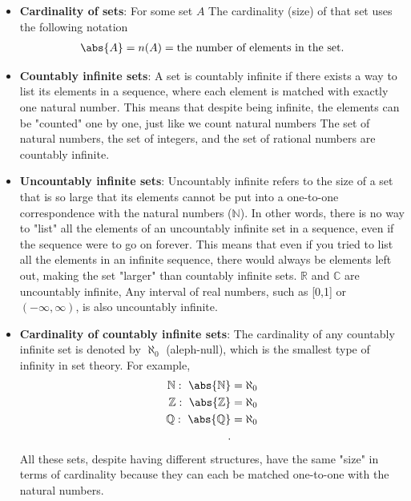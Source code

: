 \documentclass{report}
\begin{document}
\begin{itemize}
        \item \textbf{Cardinality of sets}: For some set $A$ The cardinality (size) of that set uses the following notation
            \begin{align*}
                \abs{A} = n(A) = \text{the number of elements in the set}
            .\end{align*}
        \item \textbf{Countably infinite sets}: A set is countably infinite if there exists a way to list its elements in a sequence, where each element is matched with exactly one natural number. This means that despite being infinite, the elements can be "counted" one by one, just like we count natural numbers
            \bigbreak \noindent 
            The set of natural numbers, the set of integers, and the set of rational numbers are countably infinite.
        \item \textbf{Uncountably infinite sets}: Uncountably infinite refers to the size of a set that is so large that its elements cannot be put into a one-to-one correspondence with the natural numbers ($\mathbb{N}$). In other words, there is no way to "list" all the elements of an uncountably infinite set in a sequence, even if the sequence were to go on forever.
            \bigbreak \noindent 
            This means that even if you tried to list all the elements in an infinite sequence, there would always be elements left out, making the set "larger" than countably infinite sets.
            \bigbreak \noindent 
            $\mathbb{R}$ and $\mathbb{C}$ are uncountably infinite,  Any interval of real numbers, such as [0,1] or $(-\infty, \infty)$, is also uncountably infinite.
        \item \textbf{Cardinality of countably infinite sets}: The cardinality of any countably infinite set is denoted by \(\aleph_0\) (aleph-null), which is the smallest type of infinity in set theory. For example, 
            \begin{align*}
                \mathbb{N}:\ \abs{\mathbb{N}} &= \aleph_{0} \\
                \mathbb{Z}:\ \abs{\mathbb{Z}} &= \aleph_{0} \\
                \mathbb{Q}:\ \abs{\mathbb{Q}} &= \aleph_{0} \\
            .\end{align*}
            \bigbreak \noindent 
            All these sets, despite having different structures, have the same "size" in terms of cardinality because they can each be matched one-to-one with the natural numbers.

\end{itemize}
\end{document}
